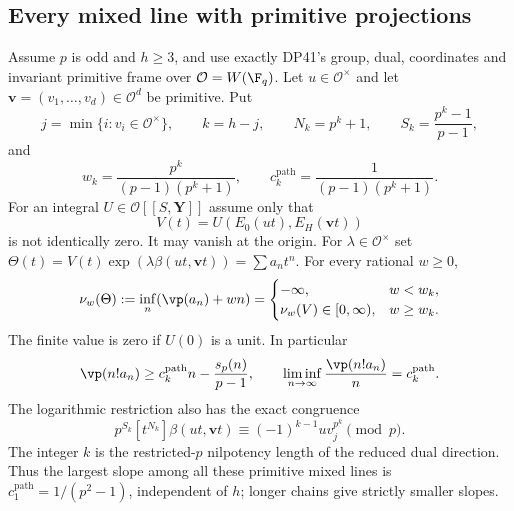 \subsection{Every mixed line with primitive projections}

\begin{theorem}\label{DP42}
Assume $p$ is odd and $h\ge3$, and use exactly DP41's group, dual, coordinates and invariant primitive frame over $\mathcal O=W(\F_q)$. Let $u\in\mathcal O^\times$ and let $\mathbf v=(v_1,\ldots,v_d)\in\mathcal O^d$ be primitive. Put
\[
 j=\min\{i:v_i\in\mathcal O^\times\},\qquad k=h-j,\qquad
 N_k=p^k+1,\qquad S_k=\frac{p^k-1}{p-1},
\]
and
\[
 w_k=\frac{p^k}{(p-1)(p^k+1)},\qquad
 c_k^{\mathrm{path}}=\frac1{(p-1)(p^k+1)}.
\]
For an integral $U\in\mathcal O[[S,\mathbf Y]]$ assume only that
\[
 V(t)=U(E_0(ut),E_H(\mathbf vt))
\]
is not identically zero. It may vanish at the origin. For $\lambda\in\mathcal O^\times$ set
$\Theta(t)=V(t)\exp(\lambda\beta(ut,\mathbf vt))=\sum a_nt^n$.
For every rational $w\ge0$,
\[
 \nu_w(\Theta):=\inf_n(\vp(a_n)+wn)=
 \begin{cases}
 -\infty,&w<w_k,\\
 \nu_w(V)\in[0,\infty),&w\ge w_k.
 \end{cases}
\]
The finite value is zero if $U(0)$ is a unit. In particular
\begin{equation}\label{eq:pathsharp}
 \vp(n!a_n)\ge c_k^{\mathrm{path}}n-\frac{s_p(n)}{p-1},
 \qquad
 \liminf_{n\to\infty}\frac{\vp(n!a_n)}n=c_k^{\mathrm{path}}.
\end{equation}
The logarithmic restriction also has the exact congruence
\begin{equation}\label{eq:pathcoefficient}
 p^{S_k}[t^{N_k}]\beta(ut,\mathbf vt)
       \equiv(-1)^{k-1}u v_j^{p^k}\pmod p.
\end{equation}
The integer $k$ is the restricted-$p$ nilpotency length of the reduced dual direction. Thus the largest slope among all these primitive mixed lines is
$c_1^{\mathrm{path}}=1/(p^2-1)$, independent of $h$; longer chains give strictly smaller slopes.
\end{theorem}

